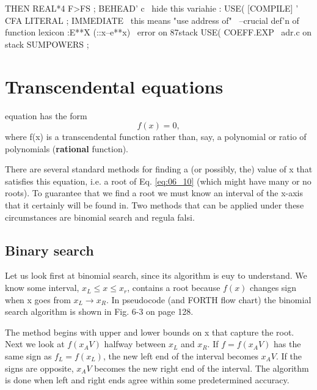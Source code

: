     THEN REAL*4 F>FS ;
BEHEAD' c \ hide this variahie
: USE( [COMPILE] ' CFA LITERAL ;
    IMMEDIATE
\ this means "use address of"
\ --crucial def'n of function lexicon
:E**X (::x--e**x) %
            \ error on 87stack
    USE( COEFF.EXP
            \ adr.c on stack
    SUMPOWERS ;

\section{Transcendental equations}

 equation has the form
\begin{equation}
f(x) = 0,
    \label{eq:06_10}
\end{equation}
where f(x) is a transcendental function rather than, say, a polynomial or ratio of polynomials (\textbf{rational} function).

There are several standard methods for finding a (or possibly, the) value of x that satisfies this equation, i.e. a root of Eq. \ref{eq:06_10} (which might have many or no roots). To guarantee that we find a root we must know an interval of the x-axis that it certainly will be found in. Two methods that can be applied under these circumstances are binomial search and regula falsi.

\subsection{Binary search}

Let us look first at binomial search, since its algorithm is euy to understand. We know some interval, $x_L \leq x \leq x_r$, contains a root because $f(x)$ changes sign when x goes from $x_L \rightarrow x_R$. In pseudocode (and FORTH flow chart) the binomial search algorithm is shown in Fig. 6-3 on page 128.

The method begins with upper and lower bounds on x that capture the root. Next we look at $f(x_AV)$ halfway between $x_L$ and $x_R$. If $f=f(x_AV)$ has the same sign as $f_L = f(x_L)$, the new left end of the interval becomes $x_AV$. If the signs are opposite, $x_AV$ becomes the new right end of the interval. The algorithm is done when left and right ends agree within some predetermined accuracy.

